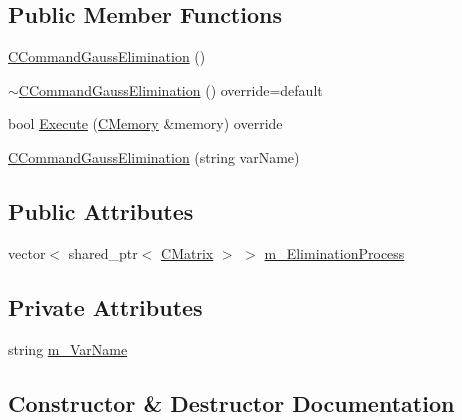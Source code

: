 \subsection*{Public Member Functions}
\begin{DoxyCompactItemize}
\item 
\hyperlink{classCCommandGaussElimination_aefc96f03e386afebdadef7225bba3743}{C\+Command\+Gauss\+Elimination} ()
\item 
\hyperlink{classCCommandGaussElimination_ad694b87633ac4281f102487dcc24dd07}{$\sim$\+C\+Command\+Gauss\+Elimination} () override=default
\item 
bool \hyperlink{classCCommandGaussElimination_a450365c81652a0963554944693c6e76c}{Execute} (\hyperlink{classCMemory}{C\+Memory} \&memory) override
\item 
\hyperlink{classCCommandGaussElimination_ac1610e9aeaf8b660f277fac4f5d390fc}{C\+Command\+Gauss\+Elimination} (string var\+Name)
\end{DoxyCompactItemize}
\subsection*{Public Attributes}
\begin{DoxyCompactItemize}
\item 
vector$<$ shared\+\_\+ptr$<$ \hyperlink{classCMatrix}{C\+Matrix} $>$ $>$ \hyperlink{classCCommandGaussElimination_aeed2262ff0fee51a256d0baa011c5e69}{m\+\_\+\+Elimination\+Process}
\end{DoxyCompactItemize}
\subsection*{Private Attributes}
\begin{DoxyCompactItemize}
\item 
string \hyperlink{classCCommandGaussElimination_a2e619e3d9fb79bca7076ab72c21c09b4}{m\+\_\+\+Var\+Name}
\end{DoxyCompactItemize}


\subsection{Constructor \& Destructor Documentation}
